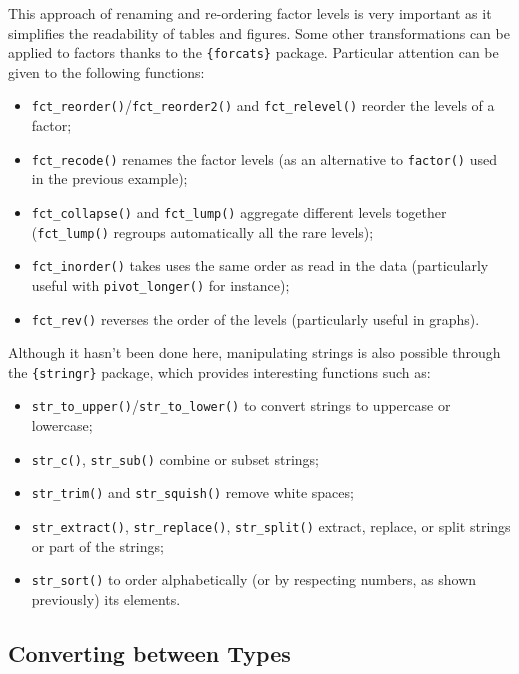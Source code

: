 \documentclass[
]{book}
\providecommand{\tightlist}{%
  \setlength{\itemsep}{0pt}\setlength{\parskip}{0pt}}
\begin{document}
This approach of renaming and re-ordering factor levels is very important as it simplifies the readability of tables and figures.
Some other transformations can be applied to factors thanks to the \texttt{\{forcats\}} package. Particular attention can be given to the following functions:

\begin{itemize}
\tightlist
\item
  \texttt{fct\_reorder()}/\texttt{fct\_reorder2()} and \texttt{fct\_relevel()} reorder the levels of a factor;
\item
  \texttt{fct\_recode()} renames the factor levels (as an alternative to \texttt{factor()} used in the previous example);
\item
  \texttt{fct\_collapse()} and \texttt{fct\_lump()} aggregate different levels together (\texttt{fct\_lump()} regroups automatically all the rare levels);
\item
  \texttt{fct\_inorder()} takes uses the same order as read in the data (particularly useful with \texttt{pivot\_longer()} for instance);
\item
  \texttt{fct\_rev()} reverses the order of the levels (particularly useful in graphs).
\end{itemize}

Although it hasn't been done here, manipulating strings is also possible through the \texttt{\{stringr\}} package, which provides interesting functions such as:

\begin{itemize}
\tightlist
\item
  \texttt{str\_to\_upper()}/\texttt{str\_to\_lower()} to convert strings to uppercase or lowercase;
\item
  \texttt{str\_c()}, \texttt{str\_sub()} combine or subset strings;
\item
  \texttt{str\_trim()} and \texttt{str\_squish()} remove white spaces;
\item
  \texttt{str\_extract()}, \texttt{str\_replace()}, \texttt{str\_split()} extract, replace, or split strings or part of the strings;
\item
  \texttt{str\_sort()} to order alphabetically (or by respecting numbers, as shown previously) its elements.
\end{itemize}

\hypertarget{converting-between-types}{%
\subsection{Converting between Types}\label{converting-between-types}}
\end{document}
